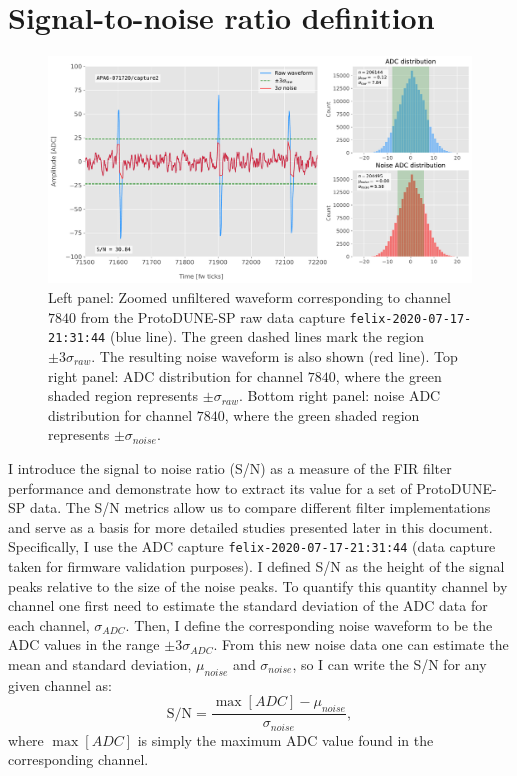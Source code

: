 \section{Signal-to-noise ratio definition}
\label{sec:matched_filter_sn_definition}

\begin{figure}[t]
	\centering
	\includegraphics[width=1\linewidth]{Images/Matched_Filter/waveform_example_raw}
	\caption[Example unfiltered waveform from a ProtoDUNE-SP raw data capture.]{Left panel: Zoomed unfiltered waveform corresponding to channel $7840$ from the ProtoDUNE-SP raw data capture \texttt{felix-2020-07-17-21:31:44} (blue line). The green dashed lines mark the region $\pm3\sigma_{raw}$. The resulting noise waveform is also shown (red line). Top right panel: ADC distribution for channel $7840$, where the green shaded region represents $\pm \sigma_{raw}$. Bottom right panel: noise ADC distribution for channel $7840$, where the green shaded region represents $\pm \sigma_{noise}$.}
	\label{fig:adcs_nofir}
\end{figure}

I introduce the signal to noise ratio (S/N) as a measure of the FIR filter performance and demonstrate how to extract its value for a set of 
ProtoDUNE-SP data. The S/N metrics allow us to compare different filter implementations and serve as a basis for more detailed studies presented later in this document. Specifically, I use the ADC capture \texttt{felix-2020-07-17-21:31:44} (data capture taken for firmware validation purposes). I defined S/N as the height of the signal peaks relative to the size of the noise peaks. To quantify this quantity channel by channel one first need to estimate the standard deviation of the ADC data for each channel, $\sigma_{ADC}$. Then, I define the corresponding noise waveform to be the ADC values in the range $\pm 3 \sigma_{ADC}$. From this new noise data one can estimate the mean and standard deviation, $\mu_{noise}$ and $\sigma_{noise}$, so I can write the S/N for any given channel as:
\begin{equation}
	\mathrm{S/N} = \frac{\max{[ADC]} - \mu_{noise}}{\sigma_{noise}},
\end{equation}
where $\max{[ADC]}$ is simply the maximum ADC value found in the corresponding channel.

